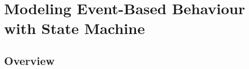 \documentclass[12pt,a4paper]{book}
\begin{document}
\chapter{Modeling Event-Based Behaviour with State Machine}
\lipsum[3]
\section{Overview}
\lipsum[4]
\end{document}
